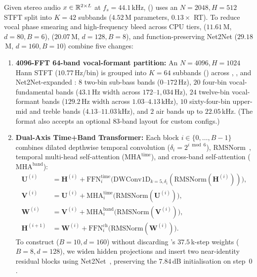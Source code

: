 Given stereo audio $x \in \mathbb{R}^{2 \times L}$ at $f_s = 44.1$\,kHz,  () uses an $N=2048, H=512$ STFT split into $K=42$ subbands ($4.52$\,M parameters, $0.13\times$ RT). To reduce vocal phase smearing and high-frequency bleed across CPU tiers,  ($11.61$\,M, $d=80, B=6$),  ($20.07$\,M, $d=128, B=8$), and function-preserving Net2Net  ($29.18$\,M, $d=160, B=10$) combine five changes:
\begin{enumerate}
  \item \textbf{4096-FFT 64-band vocal-formant partition:} An $N=4096, H=1024$ Hann STFT ($10.77$\,Hz/bin) is grouped into $K=64$ subbands () across , , and Net2Net-expanded : $8$ two-bin sub-bass bands ($0$--$172$\,Hz), $20$ four-bin vocal-fundamental bands ($43.1$\,Hz width across $172$--$1{,}034$\,Hz), $24$ twelve-bin vocal-formant bands ($129.2$\,Hz width across $1.03$--$4.13$\,kHz), $10$ sixty-four-bin upper-mid and treble bands ($4.13$--$11.03$\,kHz), and $2$ air bands up to $22.05$\,kHz. (The  format also accepts an optional $83$-band  layout for custom configs.)
  \item \textbf{Dual-Axis Time+Band Transformer:} Each block $i \in \{0,\dots,B-1\}$ combines dilated depthwise temporal convolution ($\delta_i = 2^{i \bmod 6}$), RMSNorm~\citep{zhang2019root}, temporal multi-head self-attention ($\mathrm{MHA}^{\text{time}}$), and cross-band self-attention ($\mathrm{MHA}^{\text{band}}$):
  \begin{align}
    \mathbf{U}^{(i)} &= \mathbf{H}^{(i)} + \mathrm{FFN}^{\text{time}}_i\!\big(\mathrm{DWConv1D}_{k=5,\delta_i}(\mathrm{RMSNorm}(\mathbf{H}^{(i)}))\big), \\
    \mathbf{V}^{(i)} &= \mathbf{U}^{(i)} + \mathrm{MHA}^{\text{time}}_i\!\big(\mathrm{RMSNorm}(\mathbf{U}^{(i)})\big), \\
    \mathbf{W}^{(i)} &= \mathbf{V}^{(i)} + \mathrm{MHA}^{\text{band}}_i\!\big(\mathrm{RMSNorm}(\mathbf{V}^{(i)})\big), \\
    \mathbf{H}^{(i+1)} &= \mathbf{W}^{(i)} + \mathrm{FFN}^{\text{ch}}_i\!\big(\mathrm{RMSNorm}(\mathbf{W}^{(i)})\big).
  \end{align}
  To construct  ($B=10, d=160$) without discarding 's $37.5$\,k-step weights ($B=8, d=128$), we widen hidden projections and insert two near-identity residual blocks using Net2Net~\citep{chen2016net2net}, preserving the $7.84$\,dB initialisation on step~$0$.

\end{enumerate}
